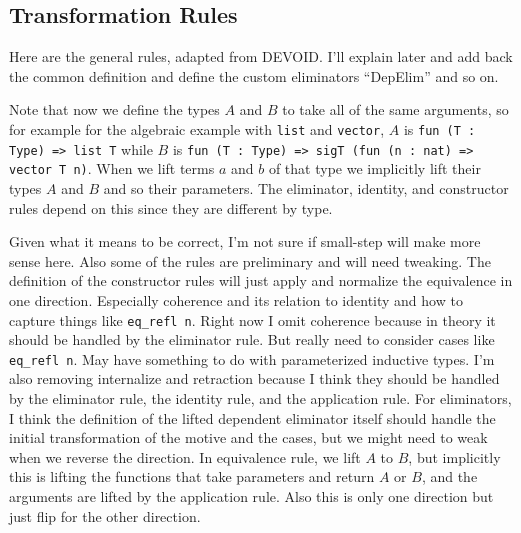 \subsection{Transformation Rules}

Here are the general rules, adapted from DEVOID.
I'll explain later and add back the common definition and define the custom eliminators ``DepElim'' and so on.

Note that now we define the types $A$ and $B$ to take all of the same arguments, so for example for the algebraic
example with \lstinline{list} and \lstinline{vector}, $A$ is \lstinline{fun (T : Type) => list T} while $B$
is \lstinline{fun (T : Type) => sigT (fun (n : nat) => vector T n)}. When we lift terms $a$ and $b$ of that type
we implicitly lift their types $A$ and $B$ and so their parameters. The eliminator, identity, and constructor rules
depend on this since they are different by type.

Given what it means to be correct, I'm not sure if small-step will make more sense here.
Also some of the rules are preliminary and will need tweaking.
The definition of the constructor rules will just apply and normalize the equivalence in one direction.
Especially coherence and its relation to identity and how to capture things like \lstinline{eq_refl n}.
Right now I omit coherence because in theory it should be handled by the eliminator rule.
But really need to consider cases like \lstinline{eq_refl n}.
May have something to do with parameterized inductive types.
I'm also removing internalize and retraction because I think they should be handled
by the eliminator rule, the identity rule, and the application rule.
For eliminators, I think the definition of the lifted dependent eliminator itself should handle the initial transformation
of the motive and the cases, but we might need to weak when we reverse the direction.
In equivalence rule, we lift $A$ to $B$, but implicitly this is lifting the functions that take parameters and return $A$ or $B$,
and the arguments are lifted by the application rule.
Also this is only one direction but just flip for the other direction.


